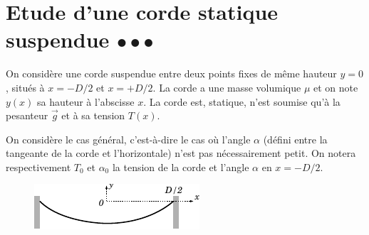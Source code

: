 \documentclass{report}
\begin{document}
\section*{Etude d'une corde statique suspendue $\bullet\bullet\bullet$}

On considère une corde suspendue entre deux points fixes de même hauteur $y=0$, situés à $x=-D/2$ et $x=+D/2$. La corde a une masse volumique $\mu$ et on note $y(x)$ sa hauteur à l'abscisse $x$. La corde est, statique, n'est soumise qu'à la pesanteur $\vec{g}$ et à sa tension $T(x)$. 

On considère le cas général, c'est-à-dire le cas où l'angle $\alpha$ (défini entre la tangeante de la corde et l'horizontale) n'est pas nécessairement petit. On notera respectivement $T_0$ et $\alpha_0$ la tension de la corde et l'angle $\alpha$ en $x=-D/2$.

\begin{figure}[h!]
\centering
		\includegraphics[scale=1.5]{onde1.pdf}
\end{figure}
\end{document}

